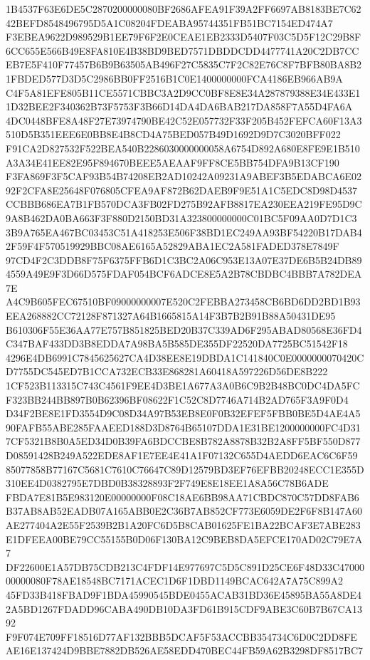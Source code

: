 \documentclass[UTF8,fontset=fandol,zihao=-4,a4paper]{ctexart}
\begin{document}
{{1B4537F63E6DE5C2870200000080BF2686AFEA91F39A2FF6697AB8183BE7C6242BEFD8548496795D5A1C08204FDEABA95744351FB51BC7154ED474A7
F3EBEA9622D989529B1EE79F6F2E0CEAE1EB2333D5407F03C5D5F12C29B8F6CC655E566B49E8FA810E4B38BD9BED7571DBDDCDD4477741A20C2DB7CC
EB7E5F410F77457B6B9B63505AB496F27C5835C7F2C82E76C8F7BFB80BA8B21FBDED577D3D5C2986BB0FF2516B1C0E1400000000FCA4186EB966AB9A
C4F5A81EFE805B11CE5571CBBC3A2D9CC0BF8E8E34A287879388E34E433E11D32BEE2F340362B73F5753F3B66D14DA4DA6BAB217DA858F7A55D4FA6A
4DC0448BFE8A48F27E73974790BE42C52E057732F33F205B452FEFCA60F13A3510D5B351EEE6E0BB8E4B8CD4A75BED057B49D1692D9D7C3020BFF022
F91CA2D827532F522BEA540B2286030000000058A6754D892A680E8FE9E1B510A3A34E41EE82E95F894670BEEE5AEAAF9FF8CE5BB754DFA9B13CF190
F3FA869F3F5CAF93B54B74208EB2AD10242A09231A9ABEF3B5EDABCA6E0292F2CFA8E25648F076805CFEA9AF872B62DAEB9F9E51A1C5EDC8D98D4537
CCBBB686EA7B1FB570DCA3FB02FD275B92AFB8817EA230EEA219FE95D9C9A8B462DA0BA663F3F880D2150BD31A323800000000C01BC5F09AA0D7D1C3
3B9A765EA467BC03453C51A418253E506F38BD1EC249AA93BF54220B17DAB42F59F4F570519929BBC08AE6165A52829ABA1EC2A581FADED378E7849F
97CD4F2C3DDB8F75F6375FFB6D1C3BC2A06C953E13A07E37DE6B5B24DB894559A49E9F3D66D575FDAF054BCF6ADCE8E5A2B78CBDBC4BBB7A782DEA7E
A4C9B605FEC67510BF09000000007E520C2FEBBA273458CB6BD6DD2BD1B93EEA268882CC72128F871327A64B1665815A14F3B7B2B91B88A50431DE95
B610306F55E36AA77E757B851825BED20B37C339AD6F295ABAD80568E36FD4C347BAF433DD3B8EDDA7A98BA5B585DE355DF22520DA7725BC51542F18
4296E4DB6991C7845625627CA4D38EE8E19DBDA1C141840C0E0000000070420CD7755DC545ED7B1CCA732ECB33E868281A60418A597226D56DE8B222
1CF523B113315C743C4561F9EE4D3BE1A677A3A0B6C9B2B48BC0DC4DA5FCF323BB244BB897B0B62396BF08622F1C52C8D7746A714B2AD765F3A9F0D4
D34F2BE8E1FD3554D9C08D34A97B53EB8E0F0B32EFEF5FBB0BE5D4AE4A590FAFB55ABE285FAAEED188D3D8764B65107DDA1E31BE1200000000FC4D31
7CF5321B8B0A5ED34D0B39FA6BDCCBE8B782A8878B32B2A8FF5BF550D877D08591428B249A522EDE8AF1E7EE4E41A1F07132C655D4AEDD6EAC6C6F59
85077858B77167C5681C7610C76647C89D12579BD3EF76EFBB20248ECC1E355D310EE4D0382795E7DBD0B38328893F2F749E8E18EE1A8A56C78B6ADE
FBDA7E81B5E983120E00000000F08C18AE6BB98AA71CBDC870C57DD8FAB6B37AB8AB52EADB07A165ABB0E2C36B7AB852CF773E6059DE2F6F8B147A60
AE277404A2E55F2539B2B1A20FC6D5B8CAB01625FE1BA22BCAF3E7ABE283E1DFEEA00BE79CC55155B0D06F130BA12C9BEB8DA5EFCE170AD02C79E7A7
DF22600E1A57DB75CDB213C4FDF14E977697C5D5C891D25CE6F48D33C4700000000080F78AE18548BC7171ACEC1D6F1DBD1149BCAC642A7A75C899A2
45FD33B418FBAD9F1BDA45990545BDE0455ACAB31BD36E45895BA55A8DE42A5BD1267FDADD96CABA490DB10DA3FD61B915CDF9ABE3C60B7B67CA1392
F9F074E709FF18516D77AF132BBB5DCAF5F53ACCBB354734C6D0C2DD8FEAE16E137424D9BBE7882DB526AE58EDD470BEC44FB59A62B3298DF8517BC7
}}
\end{document}
